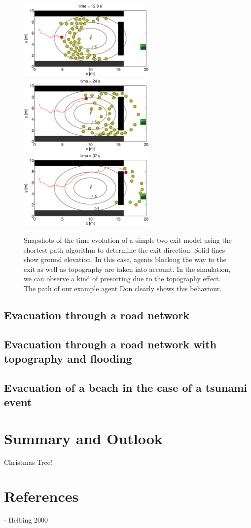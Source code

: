 \documentclass[11pt]{article}
\begin{document}
\begin{figure}
	\centering
	\includegraphics[width=0.6\textwidth]{figures/TwoExitsShortestPathWithAgentsTopo_001290.eps}
	\qquad
	\includegraphics[width=0.6\textwidth]{figures/TwoExitsShortestPathWithAgentsTopo_002400.eps}
	\qquad
	\includegraphics[width=0.6\textwidth]{figures/TwoExitsShortestPathWithAgentsTopo_003700.eps}
	\caption{Snapshots of the time evolution of a simple two-exit model using the shortest path algorithm to determine the exit direction. Solid lines show ground elevation. In this case, agents blocking the way to the exit as well as topography are taken into account. In the simulation, we can observe a kind of presorting due to the topography effect. The path of our example agent Don clearly shows this behaviour.}
	\label{fig:two_exits3}
\end{figure}

\subsection{Evacuation through a road network}
\subsection{Evacuation through a road network with topography and flooding}
\subsection{Evacuation of a beach in the case of a tsunami event}

\section{Summary and Outlook}

Christmas Tree!

\section{References}

- Helbing 2000
\end{document}

